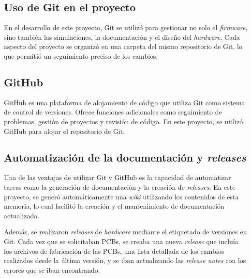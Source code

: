 \subsection{Uso de Git en el proyecto}
En el desarrollo de este proyecto, Git se utilizó para gestionar no solo el \textit{firmware}, sino también las simulaciones, la documentación y el diseño del \textit{hardware}. Cada aspecto del proyecto se organizó en una carpeta del mismo repositorio de Git, lo que permitió un seguimiento preciso de los cambios.

\subsection{GitHub}
GitHub es una plataforma de alojamiento de código que utiliza Git como sistema de control de versiones. Ofrece funciones adicionales como seguimiento de problemas, gestión de proyectos y revisión de código. En este proyecto, se utilizó GitHub para alojar el repositorio de Git.

\subsection{Automatización de la documentación y \textit{releases}}
Una de las ventajas de utilizar Git y GitHub es la capacidad de automatizar tareas como la generación de documentación y la creación de \textit{releases}. En este proyecto, se generó automáticamente una \textit{wiki} utilizando los contenidos de esta memoria, lo cual facilitó la creación y el mantenimiento de documentación actualizada.

Además, se realizaron \textit{releases} de \textit{hardware} mediante el etiquetado de versiones en Git. Cada vez que se solicitaban PCBs, se creaba una nueva \textit{release} que incluía los archivos de fabricación de las PCBs, una lista detallada de los cambios realizados desde la última versión, y se iban actualizando las \textit{release notes} con los errores que se iban encontrando.


